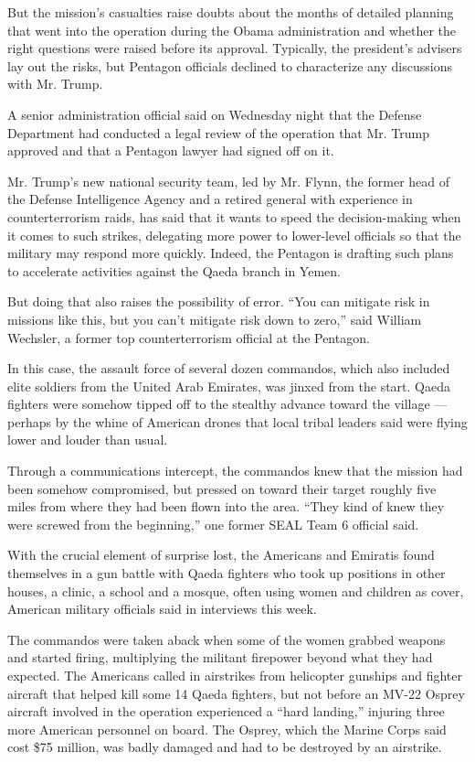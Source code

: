But the mission's casualties raise doubts about the months of detailed
planning that went into the operation during the Obama administration
and whether the right questions were raised before its approval.
Typically, the president's advisers lay out the risks, but Pentagon
officials declined to characterize any discussions with Mr. Trump.

A senior administration official said on Wednesday night that the
Defense Department had conducted a legal review of the operation that
Mr. Trump approved and that a Pentagon lawyer had signed off on it.

Mr. Trump's new national security team, led by Mr. Flynn, the former
head of the Defense Intelligence Agency and a retired general with
experience in counterterrorism raids, has said that it wants to speed
the decision-making when it comes to such strikes, delegating more power
to lower-level officials so that the military may respond more quickly.
Indeed, the Pentagon is drafting such plans to accelerate activities
against the Qaeda branch in Yemen.

But doing that also raises the possibility of error. ``You can mitigate
risk in missions like this, but you can't mitigate risk down to zero,''
said William Wechsler, a former top counterterrorism official at the
Pentagon.

In this case, the assault force of several dozen commandos, which also
included elite soldiers from the United Arab Emirates, was jinxed from
the start. Qaeda fighters were somehow tipped off to the stealthy
advance toward the village --- perhaps by the whine of American drones
that local tribal leaders said were flying lower and louder than usual.

Through a communications intercept, the commandos knew that the mission
had been somehow compromised, but pressed on toward their target roughly
five miles from where they had been flown into the area. ``They kind of
knew they were screwed from the beginning,'' one former SEAL Team 6
official said.

With the crucial element of surprise lost, the Americans and Emiratis
found themselves in a gun battle with Qaeda fighters who took up
positions in other houses, a clinic, a school and a mosque, often using
women and children as cover, American military officials said in
interviews this week.

The commandos were taken aback when some of the women grabbed weapons
and started firing, multiplying the militant firepower beyond what they
had expected. The Americans called in airstrikes from helicopter
gunships and fighter aircraft that helped kill some 14 Qaeda fighters,
but not before an MV-22 Osprey aircraft involved in the operation
experienced a ``hard landing,'' injuring three more American personnel
on board. The Osprey, which the Marine Corps said cost \$75 million, was
badly damaged and had to be destroyed by an airstrike.

